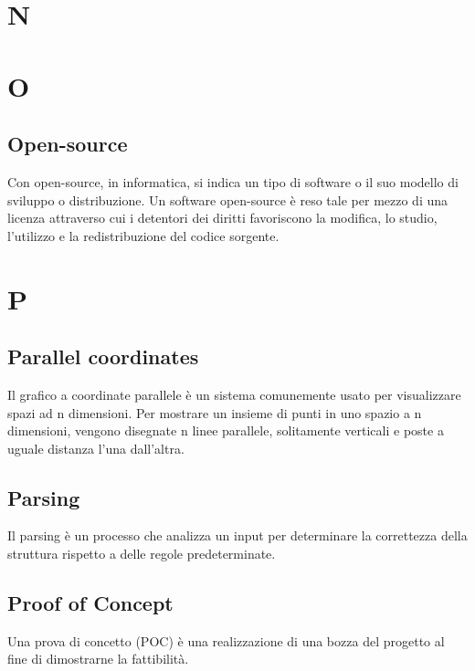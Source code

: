 \newpage
\section{N}

\newpage
\section{O}
\subsection{Open-source}
Con open-source, in informatica, si indica un tipo di software o il suo modello di sviluppo o distribuzione. Un software open-source è reso tale per mezzo di una licenza attraverso cui i detentori dei diritti favoriscono la modifica, lo studio, l'utilizzo e la redistribuzione del codice sorgente.

\newpage
\section{P}
\subsection{Parallel coordinates}
Il grafico a coordinate parallele è un sistema comunemente usato per visualizzare spazi ad n dimensioni. Per mostrare un insieme di punti in uno spazio a n dimensioni, vengono disegnate n linee parallele, solitamente verticali e poste a uguale distanza l'una dall'altra.

\subsection{Parsing}
Il parsing è un processo che analizza un input per determinare la correttezza della struttura rispetto a delle regole 
predeterminate.

\subsection{Proof of Concept}
Una prova di concetto (POC) è una realizzazione di una bozza del progetto al fine di dimostrarne la fattibilità. \newline

\newpage
